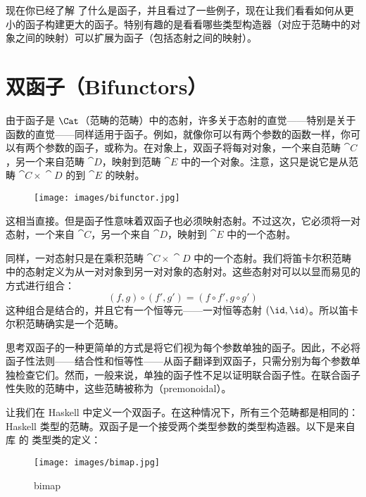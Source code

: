 
\lettrine[lhang=0.17]{现}{在你已经了解} 了什么是函子，并且看过了一些例子，现在让我们看看如何从更小的函子构建更大的函子。特别有趣的是看看哪些类型构造器（对应于范畴中的对象之间的映射）可以扩展为函子（包括态射之间的映射）。

\section{双函子（Bifunctors）}

由于函子是 $\Cat$（范畴的范畴）中的态射，许多关于态射的直觉——特别是关于函数的直觉——同样适用于函子。例如，就像你可以有两个参数的函数一样，你可以有两个参数的函子，或称为。在对象上，双函子将每对对象，一个来自范畴 $\cat{C}$，另一个来自范畴 $\cat{D}$，映射到范畴 $\cat{E}$ 中的一个对象。注意，这只是说它是从范畴 $\cat{C}\times{}\cat{D}$ 的到 $\cat{E}$ 的映射。

\begin{figure}[H]
  \centering\texttt{[image: images/bifunctor.jpg]}
\end{figure}

\noindent
这相当直接。但是函子性意味着双函子也必须映射态射。不过这次，它必须将一对态射，一个来自 $\cat{C}$，另一个来自 $\cat{D}$，映射到 $\cat{E}$ 中的一个态射。

同样，一对态射只是在乘积范畴 $\cat{C}\times{}\cat{D}$ 中的一个态射。我们将笛卡尔积范畴中的态射定义为从一对对象到另一对对象的态射对。这些态射对可以以显而易见的方式进行组合：
\[(f, g) \circ (f', g') = (f \circ f', g \circ g')\]
这种组合是结合的，并且它有一个恒等元——一对恒等态射 $(\id, \id)$。所以笛卡尔积范畴确实是一个范畴。

思考双函子的一种更简单的方式是将它们视为每个参数单独的函子。因此，不必将函子性法则——结合性和恒等性——从函子翻译到双函子，只需分别为每个参数单独检查它们。然而，一般来说，单独的函子性不足以证明联合函子性。在联合函子性失败的范畴中，这些范畴被称为（premonoidal）。

让我们在 Haskell 中定义一个双函子。在这种情况下，所有三个范畴都是相同的：Haskell 类型的范畴。双函子是一个接受两个类型参数的类型构造器。以下是来自库  的  类型类的定义：


\begin{figure}[H]
  \centering\texttt{[image: images/bimap.jpg]}
  \caption{bimap}
\end{figure}

